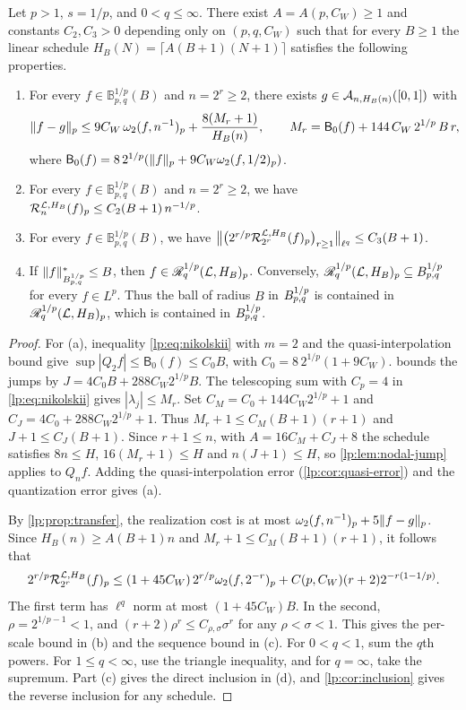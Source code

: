 \documentclass[11pt,a4paper]{article}
\begin{document}
\begin{teorema}[Critical linear height for $s=1/p$ with $p>1$]
\label{lp:thm:critical-linear}
Let $p>1$, $s=1/p$, and $0<q\le\infty$. There exist $A=A(p,C_W)\ge1$ and constants $C_2,C_3>0$ depending only on $(p,q,C_W)$ such that for every $B\ge1$ the linear schedule $H_B(N)=\lceil A(B+1)(N+1)\rceil$ satisfies the following properties.
\begin{enumerate}[label=(\alph*)]
 \item For every $f\in\mathbb B^{1/p}_{p,q}(B)$ and $n=2^r\ge2$, there exists $g\in\mathcal A_{n,H_B(n)}([0,1])$ with
 \[
  \|f-g\|_p\le 9C_W\,\omega_2(f,n^{-1})_{p}+\frac{8(M_r+1)}{H_B(n)},\qquad M_r=\mathsf B_0(f)+144\,C_W\,2^{1/p}\,B\,r,
 \]
 where $\mathsf B_0(f)=8\,2^{1/p}(\|f\|_p+9C_W\omega_2(f,1/2)_{p})$.
 \item For every $f\in\mathbb B^{1/p}_{p,q}(B)$ and $n=2^r\ge2$, we have $\mathcal R^{\mathcal L,H_B}_{n}(f)_p\le C_2(B+1)\,n^{-1/p}$.
 \item For every $f\in\mathbb B^{1/p}_{p,q}(B)$, we have $\big\|\big(2^{r/p}\mathcal R^{\mathcal L,H_B}_{2^r}(f)_p\big)_{r\ge1}\big\|_{\ell^q}\le C_3(B+1)$.
 \item If $\|f\|^*_{B^{1/p}_{p,q}}\le B$, then $f\in\mathscr R^{1/p}_{q}(\mathcal L,H_B)_p$. Conversely, $\mathscr R^{1/p}_{q}(\mathcal L,H_B)_p\subseteq B^{1/p}_{p,q}$ for every $f\in L^p$. Thus the ball of radius $B$ in $B^{1/p}_{p,q}$ is contained in $\mathscr R^{1/p}_{q}(\mathcal L,H_B)_p$, which is contained in $B^{1/p}_{p,q}$.
\end{enumerate}
\end{teorema}

\begin{proof}
For (a), inequality \eqref{lp:eq:nikolskii} with $m=2$ and the quasi-interpolation bound give $\sup|Q_2f|\le\mathsf B_0(f)\le C_0B$, with $C_0=8\,2^{1/p}(1+9C_W)$.  bounds the jumps by $J=4C_0B+288C_W2^{1/p}B$. The telescoping sum with $C_p=4$ in \eqref{lp:eq:nikolskii} gives $|\lambda_j|\le M_r$. Set $C_M=C_0+144C_W2^{1/p}+1$ and $C_J=4C_0+288C_W2^{1/p}+1$. Thus $M_r+1\le C_M(B+1)(r+1)$ and $J+1\le C_J(B+1)$. Since $r+1\le n$, with $A=16C_M+C_J+8$ the schedule satisfies $8n\le H$, $16(M_r+1)\le H$ and $n(J+1)\le H$, so \cref{lp:lem:nodal-jump} applies to $Q_nf$. Adding the quasi-interpolation error (\cref{lp:cor:quasi-error}) and the quantization error gives (a).

By \cref{lp:prop:transfer}, the realization cost is at most $\omega_2(f,n^{-1})_{p}+5\|f-g\|_p$. Since $H_B(n)\ge A(B+1)n$ and $M_r+1\le C_M(B+1)(r+1)$, it follows that
\[
 2^{r/p}\mathcal R^{\mathcal L,H_B}_{2^r}(f)_p
 \le(1+45C_W)\,2^{r/p}\omega_2(f,2^{-r})_{p}
    +C(p,C_W)(r+2)2^{-r(1-1/p)}.
\]
The first term has $\ell^q$ norm at most $(1+45C_W)B$. In the second, $\rho=2^{1/p-1}<1$, and $(r+2)\rho^r\le C_{\rho,\sigma}\sigma^r$ for any $\rho<\sigma<1$. This gives the per-scale bound in (b) and the sequence bound in (c). For $0<q<1$, sum the $q$th powers. For $1\le q<\infty$, use the triangle inequality, and for $q=\infty$, take the supremum. Part (c) gives the direct inclusion in (d), and \cref{lp:cor:inclusion} gives the reverse inclusion for any schedule.
\end{proof}
\end{document}
